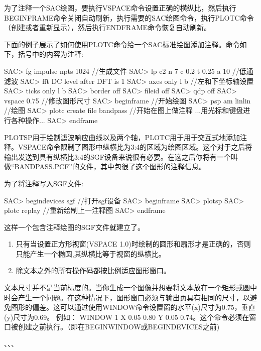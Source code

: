 为了注释一个SAC绘图，要执行VSPACE命令设置正确的横纵比，然后执行BEGINFRAME命令关闭自动刷新，执行需要的SAC绘图命令，执行PLOTC命令（创建或者重新显示），然后执行ENDFRAME命令恢复自动刷新。

下面的例子展示了如何使用PLOTC命令给一个SAC标准绘图添加注释。命令如下，括号中的内容为注释:
\begin{SACCode}
SAC> fg impulse npts 1024                      //生成文件
SAC> lp c2 n 7 c 0.2 t 0.25 a 10               //低通滤波 
SAC> fft
 DC level after DFT is 1
SAC> axes only l b                             //左和下坐标轴设置
SAC> ticks only l b
SAC> border off
SAC> fileid off
SAC> qdp off
SAC> vspace 0.75                              //修改图形尺寸
SAC> beginframe                               //开始绘图
SAC> psp am linlin                            //绘图
SAC> plotc create file bandpass               //开始在图上做注释
...用光标和键盘进行各种操作...
SAC> endframe
\end{SACCode}

PLOTSP用于绘制滤波响应曲线以及两个轴，PLOTC用于用于交互式地添加注释。VSPACE命令限制了图形中纵横比为3:4的区域为绘图区域。这个对于之后将输出发送到具有纵横比3:4的SGF设备来说很有必要。在这之后你将有一个叫做``BANDPASS.PCF''的文件，其中包很了这个图形的注释信息。

为了将注释写入SGF文件:
\begin{SACCode}
SAC> begindevices sgf                       //打开sgf设备
SAC> beginframe
SAC> plotsp 
SAC> plotc replay                           //重新绘制上一注释图
SAC> endframe
\end{SACCode}
这样一个包含注释绘图的SGF文件就建立了。

\begin{enumerate}
\item 只有当设置正方形视窗(VSPACE 1.0)时绘制的圆形和扇形才是正确的，否则只能产生一个椭圆,其纵横比等于视窗的纵横比。
\item 除文本之外的所有操作码都按比例适应图形窗口。
\end{enumerate}
文本尺寸并不是当前标度的。当你生成一个图像并想要将文本放在一个矩形或圆中时会产生一个问题。在这种情况下，图形窗口必须与输出页具有相同的尺寸，以避免图形的偏差。这可以通过使用WINDOW命令设置窗的水平(x)尺寸为0.75，垂直(y)尺寸为0.69。
例如： WINDOW 1 X 0.05 0.80 Y 0.05 0.74。这个命令必须在窗口被创建之前执行。（即在BEGINWINDOW或BEGINDEVICES之前)

、、、

